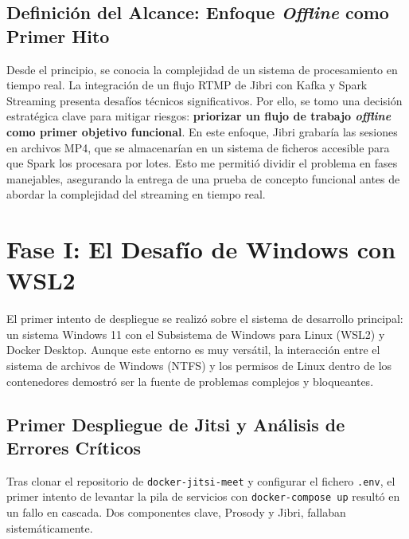\subsection{Definición del Alcance: Enfoque \textit{Offline} como Primer Hito}
Desde el principio, se conocia la complejidad de un sistema de procesamiento en tiempo real. La integración de un flujo RTMP de Jibri con Kafka y Spark Streaming presenta desafíos técnicos significativos. Por ello, se tomo una decisión estratégica clave para mitigar riesgos: \textbf{priorizar un flujo de trabajo \textit{offline} como primer objetivo funcional}. En este enfoque, Jibri grabaría las sesiones en archivos MP4, que se almacenarían en un sistema de ficheros accesible para que Spark los procesara por lotes. Esto me permitió dividir el problema en fases manejables, asegurando la entrega de una prueba de concepto funcional antes de abordar la complejidad del streaming en tiempo real.

\section{Fase I: El Desafío de Windows con WSL2}
\label{sec:desarrollo_acto1}
El primer intento de despliegue se realizó sobre el sistema de desarrollo principal: un sistema Windows 11 con el Subsistema de Windows para Linux (WSL2) y Docker Desktop. Aunque este entorno es muy versátil, la interacción entre el sistema de archivos de Windows (NTFS) y los permisos de Linux dentro de los contenedores demostró ser la fuente de problemas complejos y bloqueantes.

\subsection{Primer Despliegue de Jitsi y Análisis de Errores Críticos}
Tras clonar el repositorio de \texttt{docker-jitsi-meet} y configurar el fichero \texttt{.env}, el primer intento de levantar la pila de servicios con \texttt{docker-compose up} resultó en un fallo en cascada. Dos componentes clave, Prosody y Jibri, fallaban sistemáticamente.

